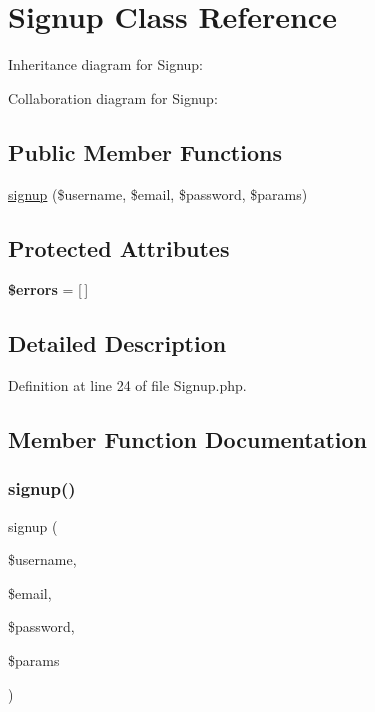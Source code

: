 \hypertarget{class_zest_1_1_auth_1_1_signup}{}\section{Signup Class Reference}
\label{class_zest_1_1_auth_1_1_signup}


Inheritance diagram for Signup\+:


Collaboration diagram for Signup\+:
\subsection*{Public Member Functions}
\begin{DoxyCompactItemize}
\item 
\mbox{\hyperlink{class_zest_1_1_auth_1_1_signup_adb957ab642825252ca494ffdf24fc27b}{signup}} (\$username, \$email, \$password, \$params)
\end{DoxyCompactItemize}
\subsection*{Protected Attributes}
\begin{DoxyCompactItemize}
\item 
\mbox{\label{class_zest_1_1_auth_1_1_signup_ab24faf4aa647cdcee494fc48524ad4ff}} 
{\bfseries \$errors} = \mbox{[}$\,$\mbox{]}
\end{DoxyCompactItemize}


\subsection{Detailed Description}


Definition at line 24 of file Signup.\+php.



\subsection{Member Function Documentation}
\mbox{\label{class_zest_1_1_auth_1_1_signup_adb957ab642825252ca494ffdf24fc27b}} 
\subsubsection{\texorpdfstring{signup()}{signup()}}
{\footnotesize\ttfamily signup (\begin{DoxyParamCaption}\item[{}]{\$username,  }\item[{}]{\$email,  }\item[{}]{\$password,  }\item[{}]{\$params }\end{DoxyParamCaption})}

